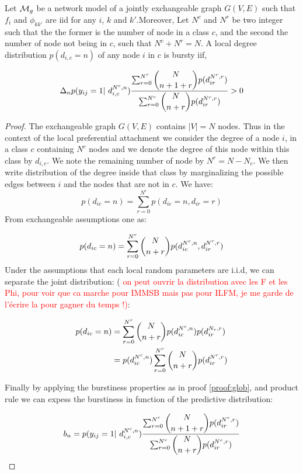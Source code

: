 \begin{theorem} \label{th:burst_local}
	Let $\mathcal{M}_g$ be a network model of a jointly exchangeable graph $G(V,E)$ such that $f_i$ and $\phi_{kk'}$ are iid for any $i$, $k$ and $k'$.Moreover,  Let $N^c$ and $N^r$ be two integer such that the the former is the number of node in a class $c$, and the second the number of node not being in $c$, such that $N^c+N^r = N$. A local degree distribution $p(d_{i,c}=n)$ of any node $i$ in $c$ is bursty iif,
	
	\begin{equation}
\Delta_n  p(y_{ij}=1 | d_{i,c}^{N^c,n}) \frac{\sum_{r=0}^{N^r}\dbinom{N}{n+1+r} p(d_{ir}^{N^r,r})}{\sum_{r=0}^{N^r} \dbinom{N}{n+r} p(d_{ir}^{N^r,r}) } > 0
	\end{equation}
	
	
\end{theorem}

\begin{proof}
The exchangeable graph $G(V,E)$ contains $|V|=N$ nodes. Thus in the context of the local preferential attachment we consider the degree of a node $i$, in a class $c$ containing $N^c$ nodes and we denote the degree of this node within this class by $d_{i,c}$. We note the remaining number of node by $N^r = N - N_c$. We then write  distribution of the degree inside that class by marginalizing the possible edges between $i$ and the nodes that are not in $c$. We have:
\begin{equation}
p(d_{ic}=n) = \sum_{r=0}^{N^r} p(d_{ic}=n,d_{ir}=r)
\end{equation}
From exchangeable assumptions one as:

\begin{equation}
p(d_{ic}=n) = \sum_{r=0}^{N^r} \dbinom{N}{n+r} p(d_{ic}^{N^c, n},d_{ir}^{N^r, r})
\end{equation}
Under the assumptions that each local random parameters are i.i.d, we can separate the joint distribution: ( \textcolor{red}{on peut ouvrir la distribution avec les F et les Phi, pour voir que ca marche pour IMMSB mais pas pour ILFM, je me garde de l'écrire la pour gagner du temps !)}: 

\begin{align}
p(d_{ic}=n) &= \sum_{r=0}^{N^r} \dbinom{N}{n+r} p(d_{ic}^{N^c, n}) p(d_{ir}^{N_r, r}) \\
 &=  p(d_{ic}^{N^c, n})\sum_{r=0}^{N^r}   \dbinom{N}{n+r} p(d_{ir}^{N^r, r})
\end{align}

Finally by applying the burstiness properties as in proof \ref{proof:glob}, and product rule we can expess the burstiness in function of the predictive distribution:

\begin{equation} \label{eq:29}
b_n =  p(y_{ij}=1 | d_{i,c}^{N^c,n}) \frac{\sum_{r=0}^{N^r}\dbinom{N}{n+1+r} p(d_{ir}^{N^r,r})}{\sum_{r=0}^{N^r} \dbinom{N}{n+r} p(d_{ir}^{N^r,r}) }
\end{equation}

\end{proof}

